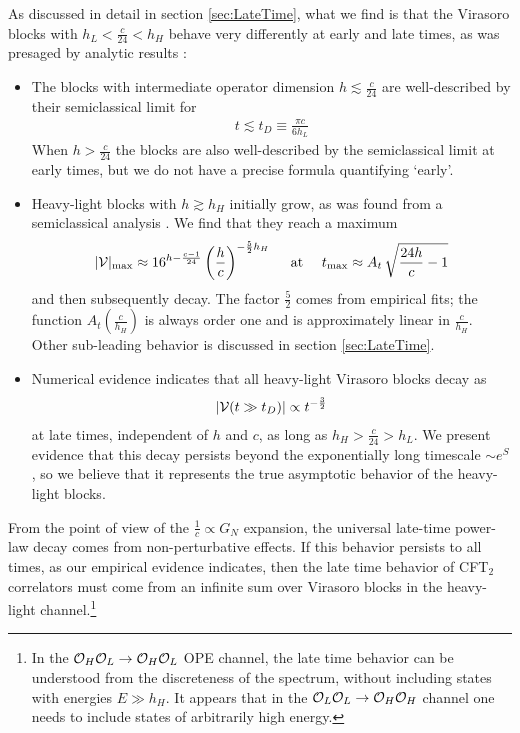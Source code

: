 \documentclass[12pt]{article}
\numberwithin{equation}{section}
\newcommand{\be}{\begin{eqnarray}}
\newcommand{\ee}{\end{eqnarray}}
\newcommand{\CO}{{\cal O}}
\newcommand{\CV}{{\cal V}}
\begin{document}
As discussed in detail in section \ref{sec:LateTime}, what we find is that the Virasoro blocks with $h_L < \frac{c}{24} < h_H$ behave very differently at early and late times, as was presaged by analytic results \cite{Fitzpatrick:2016ive}:
\begin{itemize}
\item The blocks with intermediate operator dimension $h \lesssim \frac{c}{24}$ are well-described by their semiclassical limit \cite{Fitzpatrick:2014vua, Fitzpatrick:2015zha, Fitzpatrick:2016mjq} for
\be
t \lesssim t_D \equiv \frac{\pi c}{6 h_L}
\ee 
When $h > \frac{c}{24}$ the blocks are also well-described by the semiclassical limit at early times, but we do not have a precise formula quantifying `early'.
\item  Heavy-light blocks with $h \gtrsim h_H$ initially grow, as was found from a semiclassical analysis \cite{Fitzpatrick:2016mjq}.  We find that they reach a maximum 
\be \label{eq:IntroVmaxtmax}
|\CV|_{\max} \approx 16^{h - \frac{c-1}{24}}  \left( \frac{h}{c} \right)^{-\frac{5}{2} h_H} \ \ \ \ \mathrm{at} \ \ \ \ t_{\max} \approx A_{t}\, \sqrt{\frac{24 h}{c} - 1}
\ee
and then subsequently decay. The factor $\frac{5}{2}$ comes from empirical fits; the function $A_{t}(\frac{c}{h_H})$ is always order one and is approximately linear in $\frac{c}{h_H}$.  Other sub-leading behavior is discussed in section \ref{sec:LateTime}.
\item Numerical evidence indicates that all heavy-light Virasoro blocks decay as
\be
\left|\CV(t \gg t_D)\right| \propto t^{-\frac{3}{2}}
\ee
at late times, independent of $h$ and $c$, as long as $h_H > \frac{c}{24} > h_L$.  We present evidence that this decay persists beyond the exponentially long timescale $\sim e^S$, so we believe that it represents the true asymptotic behavior of the heavy-light blocks.
\end{itemize}
From the point of view of the  $\frac{1}{c} \propto G_N$ expansion, the universal late-time power-law decay comes from non-perturbative effects.  If this behavior persists to all times, as our empirical evidence indicates, then the late time behavior of CFT$_2$ correlators must come from an infinite sum over Virasoro blocks in the heavy-light channel.\footnote{In the $\CO_H \CO_L \to \CO_H \CO_L$ OPE channel, the late time behavior can be understood from the discreteness of the spectrum, without including states with energies $E \gg h_H$.  It appears that in the $\CO_L \CO_L \to \CO_H \CO_H$ channel one needs to include states of arbitrarily high energy.}
\end{document}
